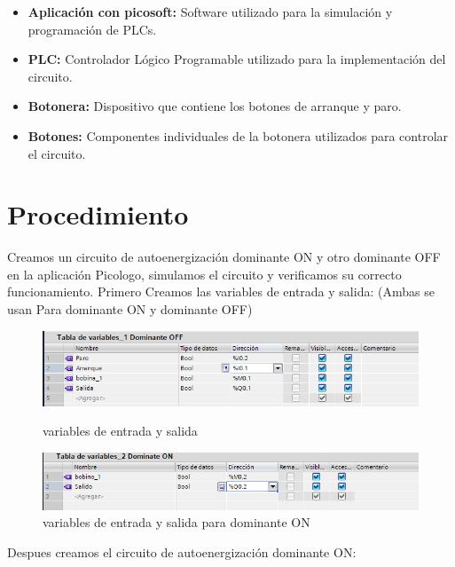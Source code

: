 \documentclass[12pt]{report}
\begin{document}
\begin{itemize}
  \item \textbf{Aplicación con picosoft:} Software utilizado para la simulación y programación de PLCs.
  \item \textbf{PLC:} Controlador Lógico Programable utilizado para la implementación del circuito.
  \item \textbf{Botonera:} Dispositivo que contiene los botones de arranque y paro.
  \item \textbf{Botones:} Componentes individuales de la botonera utilizados para controlar el circuito.
\end{itemize}

\section{Procedimiento}
Creamos un circuito de autoenergización dominante ON y otro dominante OFF en la aplicación Picologo, simulamos el circuito y verificamos su correcto funcionamiento.
Primero Creamos las variables de entrada y salida: (Ambas se usan Para dominante ON y dominante OFF)

\begin{figure}[H]
  \centering
  \includegraphics[width=\textwidth]{screenshots/Variables.png}
  \caption{variables de entrada y salida}
  \label{fig:first_image}
  \vspace{1cm} %
  \includegraphics[width=\textwidth]{screenshots/Variables_ON.png}
  \caption{variables de entrada y salida para dominante ON}
  \label{fig:second_image}
\end{figure}

Despues creamos el circuito de autoenergización dominante ON:
\begin{center}

  
\end{center}
\end{document}
